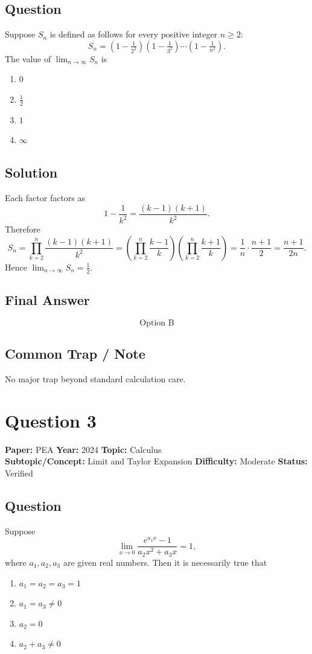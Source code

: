 \documentclass[11pt]{article}
\begin{document}
\subsection*{Question}
Suppose $S_n$ is defined as follows for every positive integer $n\ge 2$:
\[
S_n=\left(1-\tfrac{1}{2^2}\right)\!\left(1-\tfrac{1}{3^2}\right)\cdots\!\left(1-\tfrac{1}{n^2}\right).
\]
The value of $\displaystyle\lim_{n\to\infty}S_n$ is
\begin{enumerate}[label=(\Alph*)]
\item $0$
\item $\tfrac{1}{2}$
\item $1$
\item $\infty$
\end{enumerate}

\subsection*{Solution}
Each factor factors as
\[
1-\frac{1}{k^2}=\frac{(k-1)(k+1)}{k^2}.
\]
Therefore
\[
S_n=\prod_{k=2}^{n}\frac{(k-1)(k+1)}{k^2}
=\left(\prod_{k=2}^{n}\frac{k-1}{k}\right)\!\left(\prod_{k=2}^{n}\frac{k+1}{k}\right)
=\frac{1}{n}\cdot\frac{n+1}{2}
=\frac{n+1}{2n}.
\]
Hence $\lim_{n\to\infty}S_n=\tfrac{1}{2}$.

\subsection*{Final Answer}
\[
\boxed{\text{Option B}}
\]

\subsection*{Common Trap / Note}
No major trap beyond standard calculation care.

\section*{Question 3}
\textbf{Paper:} PEA \quad \textbf{Year:} 2024 \quad \textbf{Topic:} Calculus \\
\textbf{Subtopic/Concept:} Limit and Taylor Expansion \quad \textbf{Difficulty:} Moderate \quad \textbf{Status:} Verified

\subsection*{Question}
Suppose
\[
\lim_{x\to 0}\frac{e^{a_1 x}-1}{a_2 x^{2}+a_3 x}=1,
\]
where $a_1,a_2,a_3$ are given real numbers. Then it is necessarily true that
\begin{enumerate}[label=(\Alph*)]
\item $a_1=a_2=a_3=1$
\item $a_1=a_3\ne 0$
\item $a_2=0$
\item $a_2+a_3\ne 0$
\end{enumerate}
\end{document}
